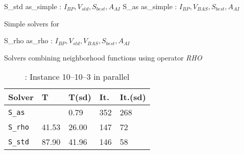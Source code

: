 \begin{algorithm}[t]
\dontprintsemicolon
\SetNoline
{}
 S\_std  as\_simple\;
\algoindent {} : $I_{BP}, V_{std}, S_{best}, A_{AI}$ \;
 S\_as  as\_simple\;
\algoindent {} : $I_{BP}, V_{BAS}, S_{best}, A_{AI}$ \; 
\caption{Simple solvers for \SGP}\label{as:golfers10-10-3}
\end{algorithm}

\begin{algorithm}[H]
\dontprintsemicolon
\SetNoline
{}
 S\_rho  as\_rho\;
\algoindent {} : $I_{BP}, V_{std}, V_{BAS}, S_{best}, A_{AI}$ \;
\caption{Solvers combining neighborhood functions using operator {\it RHO}}\label{as:golfers_rho}
\end{algorithm}

\begin{table}
\centering 
\renewcommand{\arraystretch}{1}
\begin{tabular}{p{4cm}|R{1.3cm}R{1.3cm}R{1.3cm}R{1.3cm}}
\hline
{\bf Solver} & T & T(sd) & It. & It.(sd) \\
\hline
\texttt{S\_as} &  & 0.79 & 352 & 268 \\		
\texttt{S\_rho} & 41.53 & 26.00 & 147 & 72\\
\texttt{S\_std} & 87.90 & 41.96 & 146 & 58 \\
\hline
\end{tabular}
\caption{\sg: Instance 10--10--3 in parallel}
\label{tab:golfers10-10-3}
\end{table}

